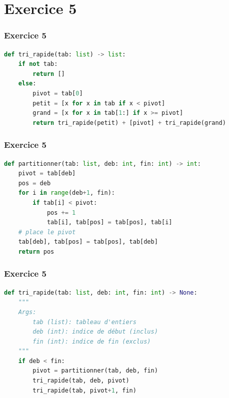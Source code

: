 \documentclass[svgnames,11pt]{beamer}
\begin{document}
\section{Exercice 5}
\begin{frame}[fragile]
    \frametitle{Exercice 5}

\begin{center}
\begin{lstlisting}[language=Python , basicstyle=\ttfamily\small, xleftmargin=1em, xrightmargin=1em]
def tri_rapide(tab: list) -> list:
    if not tab:
        return []
    else:
        pivot = tab[0]
        petit = [x for x in tab if x < pivot]
        grand = [x for x in tab[1:] if x >= pivot]
        return tri_rapide(petit) + [pivot] + tri_rapide(grand)
\end{lstlisting}
\end{center}  

\end{frame}
\begin{frame}[fragile]
    \frametitle{Exercice 5}

\begin{center}
\begin{lstlisting}[language=Python , basicstyle=\ttfamily\small, xleftmargin=1em, xrightmargin=1em]
def partitionner(tab: list, deb: int, fin: int) -> int:
    pivot = tab[deb]
    pos = deb
    for i in range(deb+1, fin):
        if tab[i] < pivot:
            pos += 1
            tab[i], tab[pos] = tab[pos], tab[i]
    # place le pivot
    tab[deb], tab[pos] = tab[pos], tab[deb]
    return pos
\end{lstlisting}
\end{center}  

\end{frame}
\begin{frame}[fragile]
    \frametitle{Exercice 5}

\begin{center}
\begin{lstlisting}[language=Python , basicstyle=\ttfamily\small, xleftmargin=1em, xrightmargin=1em]
def tri_rapide(tab: list, deb: int, fin: int) -> None:
    """
    Args:
        tab (list): tableau d'entiers
        deb (int): indice de début (inclus)
        fin (int): indice de fin (exclus)
    """
    if deb < fin:
        pivot = partitionner(tab, deb, fin)
        tri_rapide(tab, deb, pivot)
        tri_rapide(tab, pivot+1, fin)
\end{lstlisting}
\end{center}  

\end{frame}
\end{document}
